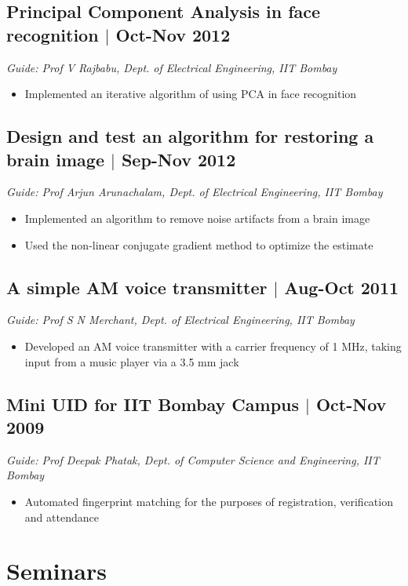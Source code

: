 \documentclass[12pt]{article}
\begin{document}
\subsection*{Principal Component Analysis in face recognition $\vert$  Oct-Nov 2012} 
\emph{Guide: Prof V Rajbabu, Dept. of Electrical Engineering, IIT Bombay}  
\begin{itemize}
\item Implemented an iterative algorithm of using PCA in face recognition  
\end{itemize}

\subsection*{Design and test an algorithm for restoring a brain image $\vert$  Sep-Nov 2012}
\emph{Guide: Prof Arjun Arunachalam, Dept. of Electrical Engineering, IIT Bombay}  
\begin{itemize}
\item Implemented an algorithm to remove noise artifacts from a brain image  
\item Used the non-linear conjugate gradient method to optimize the estimate
\end{itemize}

\subsection*{A simple AM voice transmitter $\vert$ Aug-Oct 2011} 
\emph{Guide: Prof S N Merchant, Dept. of Electrical Engineering, IIT Bombay}
\begin{itemize} 
\item Developed an AM voice transmitter with a carrier frequency of 1 MHz, taking input from a music player via a 3.5 mm jack
\end{itemize}

\subsection*{Mini UID for IIT Bombay Campus $\vert$  Oct-Nov 2009}
\emph{Guide: Prof Deepak Phatak, Dept. of Computer Science and Engineering, IIT Bombay} 
\begin{itemize}
\item Automated fingerprint matching for the purposes of registration, verification and attendance 
\end{itemize}

\section*{Seminars}
\end{document}

